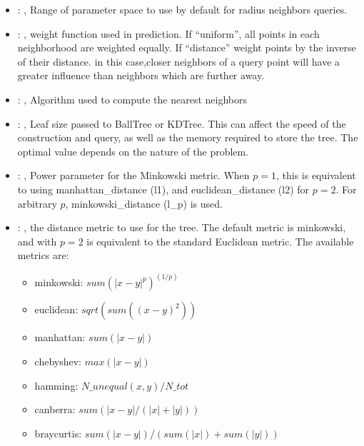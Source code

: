 \begin{itemize}
    \item {}: , 
      Range of parameter space to use by default for radius neighbors queries.

    \item {}: , 
      weight function used in prediction. If ``uniform'', all points in each neighborhood
      are weighted equally. If ``distance'' weight points by the inverse of their distance. in this
      case,closer neighbors of a query point will have a greater influence than neighbors which are
      further away.

    \item {}: , 
      Algorithm used to compute the nearest neighbors

    \item {}: , 
      Leaf size passed to BallTree or KDTree. This can affect the speed of the construction
      and query, as well as the memory required to store the tree. The optimal value depends on the
      nature of the problem.

    \item {}: , 
      Power parameter for the Minkowski metric. When $p = 1$, this is equivalent to using
      manhattan\_distance (l1), and euclidean\_distance (l2) for $p = 2$. For arbitrary $p$,
      minkowski\_distance                                                  (l\_p) is used.

    \item {}: , 
      the distance metric to use for the tree. The default metric is minkowski, and with
      $p=2$ is equivalent to the standard Euclidean metric.
      The available metrics are:                                                  \begin{itemize}
      \item minkowski: $sum(|x - y|^p)^(1/p)$
      \item euclidean: $sqrt(sum((x - y)^2))$
      \item manhattan: $sum(|x - y|)$                                                    \item
      chebyshev: $max(|x - y|)$                                                    \item hamming:
      $N\_unequal(x, y) / N\_tot$                                                    \item canberra:
      $sum(|x - y| / (|x| + |y|))$                                                    \item
      braycurtis: $sum(|x - y|) / (sum(|x|) + sum(|y|))$
      \end{itemize}
  \end{itemize}


